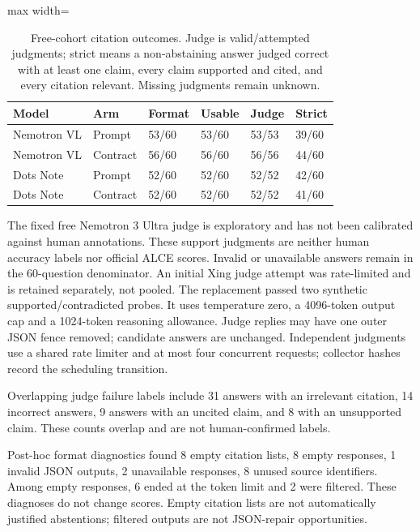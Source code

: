 \begin{table}[t]
\centering
\caption{Free-cohort citation outcomes. Judge is valid/attempted judgments; strict means a non-abstaining answer judged correct with at least one claim, every claim supported and cited, and every citation relevant. Missing judgments remain unknown.}
\label{tab:free-citations}
\begingroup\small\setlength{\tabcolsep}{3pt}
\begin{adjustbox}{max width=\linewidth}
\begin{tabular}{llllll}
\hline
Model & Arm & Format & Usable & Judge & Strict \\
\hline
Nemotron VL & Prompt & 53/60 & 53/60 & 53/53 & 39/60 \\
Nemotron VL & Contract & 56/60 & 56/60 & 56/56 & 44/60 \\
Dots Note & Prompt & 52/60 & 52/60 & 52/52 & 42/60 \\
Dots Note & Contract & 52/60 & 52/60 & 52/52 & 41/60 \\
\hline
\end{tabular}
\end{adjustbox}\endgroup
\end{table}

The fixed free Nemotron 3 Ultra judge is exploratory and has not been calibrated against human annotations. These support judgments are neither human accuracy labels nor official ALCE scores. Invalid or unavailable answers remain in the 60-question denominator. An initial Xing judge attempt was rate-limited and is retained separately, not pooled. The replacement passed two synthetic supported/contradicted probes. It uses temperature zero, a 4096-token output cap and a 1024-token reasoning allowance. Judge replies may have one outer JSON fence removed; candidate answers are unchanged. Independent judgments use a shared rate limiter and at most four concurrent requests; collector hashes record the scheduling transition.

Overlapping judge failure labels include 31 answers with an irrelevant citation, 14 incorrect answers, 9 answers with an uncited claim, and 8 with an unsupported claim. These counts overlap and are not human-confirmed labels.

Post-hoc format diagnostics found 8 empty citation lists, 8 empty responses, 1 invalid JSON outputs, 2 unavailable responses, 8 unused source identifiers. Among empty responses, 6 ended at the token limit and 2 were filtered. These diagnoses do not change scores. Empty citation lists are not automatically justified abstentions; filtered outputs are not JSON-repair opportunities.

